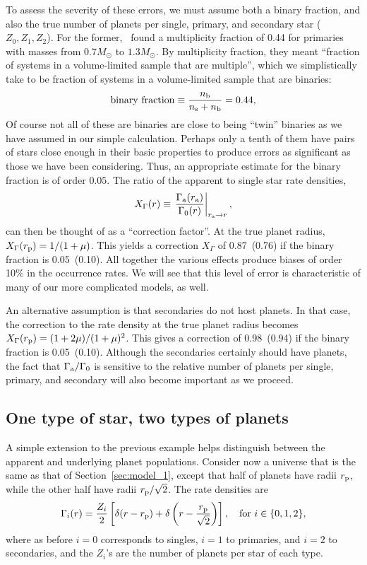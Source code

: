 \documentclass[12pt,modern]{aastex61}
\renewcommand{\a}{_{\rm a}}
\newcommand{\s}{_{\rm s}}
\newcommand{\p}{_{\rm p}}
\renewcommand{\b}{_{\rm b}}
\begin{document}
To assess the severity of these errors, we must assume both a binary fraction, 
and also the true number of planets per single, primary, and secondary star 
($Z_0,Z_1,Z_2$).
For the former,~\citet{raghavan_survey_2010} found a multiplicity 
fraction of 0.44 for primaries with masses from $0.7M_\odot$ to $1.3M_\odot$.
By multiplicity fraction, they meant ``fraction of systems in a volume-limited 
sample that are multiple'', which we simplistically take to be fraction of 
systems in a volume-limited sample that are binaries:
\begin{equation}
{\rm binary\ fraction} \equiv \frac{n\b}{n\s + n\b} = 0.44,
\end{equation}
Of course not all of these are binaries are close to being ``twin'' binaries 
as we have assumed in our simple calculation.
Perhaps only a tenth of them have pairs of stars close enough
in their basic properties to produce errors as significant as those
we have been considering.  Thus, an appropriate estimate
for the binary fraction is of order $0.05$.
The ratio of the apparent to single star rate densities,
\begin{equation}
X_\Gamma(r) \equiv \left. \frac{\Gamma\a(r\a)}{\Gamma_0(r)} \right|_{r\a 
    \rightarrow r},
\end{equation}
can then be thought of as a ``correction factor''.
At the true planet radius, $X_\Gamma(r\p)=1/(1+\mu)$.
This yields a correction $X_\Gamma$ of 0.87~(0.76) if the binary fraction is 
0.05~(0.10).
All together the various effects produce biases of order 10\% in the
occurrence rates.  We will see that this level of error is characteristic
of many of our more complicated models, as well.

An alternative assumption is that secondaries do not host planets. In that 
case, the correction to the rate density at the true planet radius becomes 
$X_\Gamma(r\p) = (1+2\mu)/(1+\mu)^2$.
This gives a correction of 0.98~(0.94) if the binary fraction is 0.05~(0.10).
Although the secondaries certainly should have planets, 
the fact that $\Gamma\a/\Gamma_0$ is sensitive to the relative number 
of planets per single, primary, and secondary will also become
important as we proceed.

\subsection{One type of star, two types of planets}

A simple extension to the previous example helps distinguish 
between the apparent and underlying planet populations.
Consider now a universe that is the same as that of 
Section~\ref{sec:model_1}, except that half of planets have radii $r\p$, 
while the other half have radii $r\p/\sqrt{2}$.
The rate densities are
\begin{equation}
\Gamma_i(r) = \frac{Z_i}{2} \left[
\delta(r-r\p) + \delta\left(r-\frac{r\p}{\sqrt{2}}\right)
\right], \quad {\rm for}\  i \in \{ 0,1,2 \},
\end{equation}
where as before $i=0$ corresponds to singles, $i=1$ to primaries, and $i=2$ to 
secondaries, and the $Z_i$'s are the number of planets per star of each type.
\end{document}
